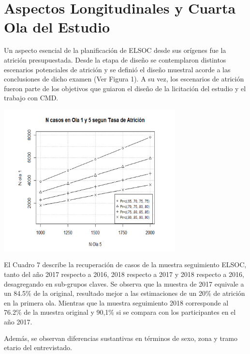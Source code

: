 \documentclass[
  openany]{book}
\let\origfigure\figure
\let\endorigfigure\endfigure
\renewenvironment{figure}[1][2] {
    \expandafter\origfigure\expandafter[H]
} {
    \endorigfigure
}
\begin{document}
\hypertarget{aspectos-longitudinales-y-cuarta-ola-del-estudio}{%
\section{Aspectos Longitudinales y Cuarta Ola del Estudio}\label{aspectos-longitudinales-y-cuarta-ola-del-estudio}}

Un aspecto esencial de la planificación de ELSOC desde sus orígenes fue la atrición presupuestada. Desde la etapa de diseño se contemplaron distintos escenarios potenciales de atrición y se definió el diseño muestral acorde a las conclusiones de dicho examen (Ver Figura 1). A su vez, los escenarios de atrición fueron parte de los objetivos que guiaron el diseño de la licitación del estudio y el trabajo con CMD.

\begin{figure}
\centering
\includegraphics[width=0.7\textwidth,height=\textheight]{../Imagenes/attrition_01.png}
\caption{\label{fig:atricion} Diseño Muestral de ELSOC según Ola}
\end{figure}

El Cuadro 7 describe la recuperación de casos de la muestra seguimiento ELSOC, tanto del año 2017 respecto a 2016, 2018 respecto a 2017 y 2018 respecto a 2016, desagregando en sub-grupos claves. Se observa que la muestra de 2017 equivale a un 84.5\% de la original, resultado mejor a las estimaciones de un 20\% de atrición en la primera ola. Mientras que la muestra seguimiento 2018 corresponde al 76.2\% de la muestra original y 90,1\% si se compara con los participantes en el año 2017.

Además, se observan diferencias sustantivas en términos de sexo, zona y tramo etario del entrevistado.
\end{document}
